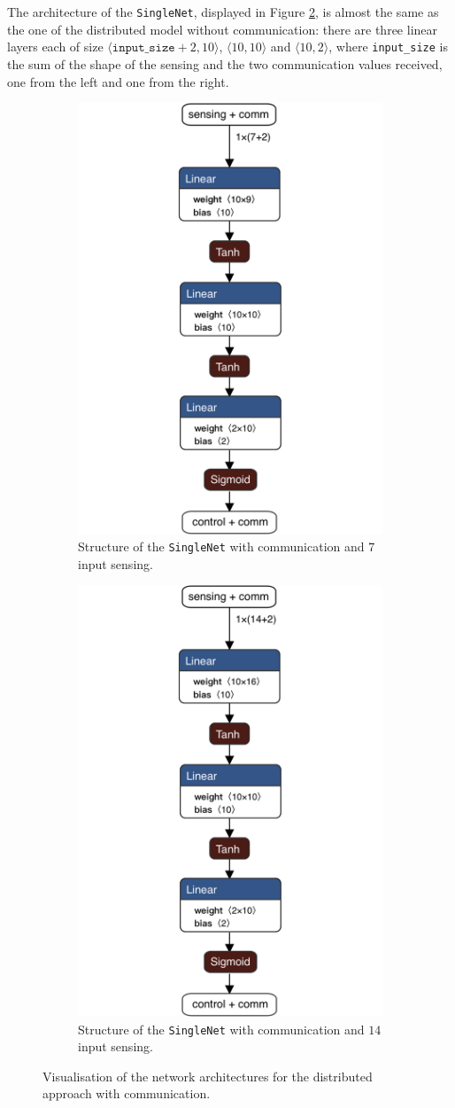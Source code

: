 The architecture of the \texttt{SingleNet}, displayed in Figure 
\ref{fig:singlenetcomm1}, is almost the same as the one of the distributed model 
without communication: there are three linear layers each of size 
$\langle\mathtt{input\_size} + 2, 10\rangle$,  $\langle 10, 
10\rangle$ and $\langle 10, 2\rangle$, where \texttt{input\_size} is the sum of 
the shape of the sensing and the two communication values received, one from 
the left and one from the right.

\begin{figure}[H]
	\centering
	\begin{subfigure}[h]{0.495\textwidth}
		\centering
		\includegraphics[width=.3\textwidth]{contents/images/task1distributedcomm@4x}%
		\caption{Structure of the \texttt{SingleNet} with communication and $7$ 
		input sensing.}
	\end{subfigure}
	\hfill
	\begin{subfigure}[h]{0.495\textwidth}
		\centering
		\includegraphics[width=.3\textwidth]{contents/images/task1distributed_allcomm@4x}
		\caption{Structure of the \texttt{SingleNet} with communication and $14$ 
		input sensing.}
		\label{fig:singlenet14comm1}
	\end{subfigure}
	\caption[Network architectures for the distributed approach with 
	communication.]{Visualisation of the network architectures for the distributed 
	approach with communication.}
	\label{fig:singlenetcomm1}
\end{figure}

